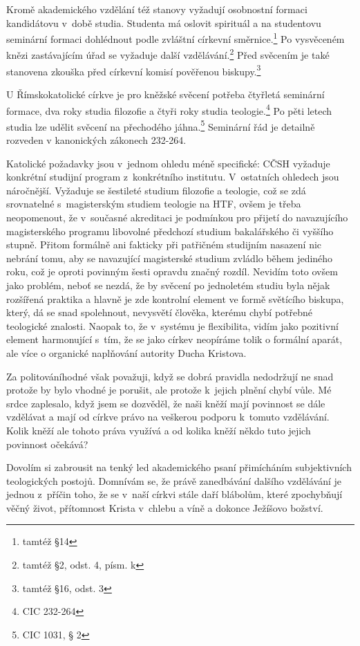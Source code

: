 Kromě akademického vzdělání též stanovy vyžadují osobnostní formaci kandidátovu
v~době studia. Studenta má oslovit spirituál a na studentovu seminární formaci
dohlédnout podle zvláštní církevní směrnice.\footnote{tamtéž §14}
Po vysvěceném knězi zastávajícím úřad se vyžaduje další
vzdělávání.\footnote{tamtéž §2, odst. 4, písm. k}
Před svěcením je také stanovena zkouška před církevní komisí pověřenou
biskupy.\footnote{tamtéž §16, odst. 3}

U Římskokatolické církve je pro kněžské svěcení potřeba čtyřletá seminární
formace, dva roky studia filozofie a čtyři roky studia teologie.\footnote{CIC
232-264} Po pěti letech studia lze udělit svěcení na přechodého
jáhna.\footnote{CIC 1031, § 2}
Seminární řád je detailně rozveden v kanonických zákonech 232-264.

Katolické požadavky jsou v~jednom ohledu méně specifické: CČSH vyžaduje
konkrétní studijní program z~konkrétního institutu. V~ostatních ohledech jsou
náročnější. Vyžaduje se šestileté studium filozofie a teologie, což se zdá
srovnatelné s~magisterským studiem teologie na HTF, ovšem je třeba neopomenout,
že v~současné akreditaci je podmínkou pro přijetí do navazujícího magisterského
programu libovolné předchozí studium bakalářského či vyššího stupně. Přitom
formálně ani fakticky při patřičném studijním nasazení nic nebrání tomu, aby se
navazující magisterské studium zvládlo během jediného roku, což je oproti
povinným šesti opravdu značný rozdíl. Nevidím toto ovšem jako problém, neboť se
nezdá, že by svěcení po jednoletém studiu byla nějak rozšířená praktika a hlavně
je zde kontrolní element ve formě světícího biskupa, který, dá se snad
spolehnout, nevysvětí člověka, kterému chybí potřebné teologické znalosti.
Naopak to, že v~systému je flexibilita, vidím jako pozitivní element harmonující
s~tím, že se jako církev neopíráme tolik o formální aparát, ale více o organické
naplňování autority Ducha Kristova.

Za politováníhodné však považuji, když se dobrá pravidla nedodržují ne snad
protože by bylo vhodné je porušit, ale protože k~jejich plnění chybí vůle. Mé
srdce zaplesalo, když jsem se dozvěděl, že naši kněží mají povinnost se dále
vzdělávat a mají od církve právo na veškerou podporu k~tomuto vzdělávání. Kolik
kněží ale tohoto práva využívá a od kolika kněží někdo tuto jejich povinnost
očekává?

Dovolím si zabrousit na tenký led akademického psaní přimícháním subjektivních
teologických postojů. Domnívám se, že právě zanedbávání dalšího vzdělávání je
jednou z~příčin toho, že se v~naší církvi stále daří blábolům,
které zpochybňují věčný život, přítomnost Krista v~chlebu a víně a dokonce
Ježíšovo božství.

